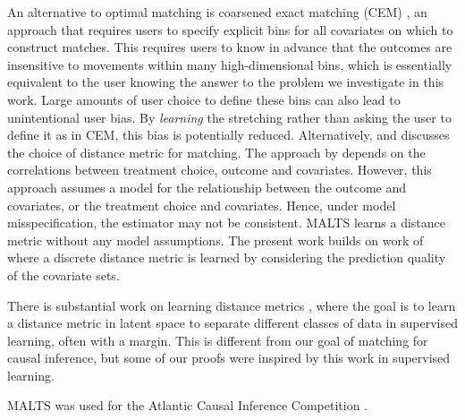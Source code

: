 An alternative to optimal matching is coarsened exact matching (CEM) \citep{iacus2012causal}, an approach that requires users to specify explicit bins for all covariates on which to construct matches. 
This requires users to know in advance that the outcomes are insensitive to movements within many high-dimensional bins, 
which is essentially equivalent to the user knowing the answer to the problem we investigate in this work. Large amounts of user choice to define these bins can also lead to unintentional user bias. By \textit{learning} the stretching rather than asking the user to define it as in CEM, this bias is potentially reduced. 
Alternatively, \cite{zhao2004} and \cite{imbens2004nonparametric} discusses the choice of distance metric for matching. The approach by \cite{zhao2004} depends on the correlations between treatment choice, outcome and covariates. However, this approach assumes a model for the relationship between the outcome and covariates, or the treatment choice and covariates. Hence, under model misspecification, the estimator may not be consistent. MALTS learns a distance metric without any model assumptions. 
The present work builds on work of  \cite{wang2017flame, DiengEtAl2018} where a discrete distance metric is learned by considering the prediction quality of the covariate sets. 

There is substantial work on learning distance metrics \citep[e.g.,][]{goldberger2005neighbourhood,weinberger2006distance,weinberger2009distance}, where the goal is to learn a distance metric in latent space to separate different classes of data in supervised learning, often with a margin. This is different from our goal of matching for causal inference, but some of our proofs were inspired by this work in supervised learning. 

MALTS was used for the Atlantic Causal Inference Competition \citep{harsh2019acic}.